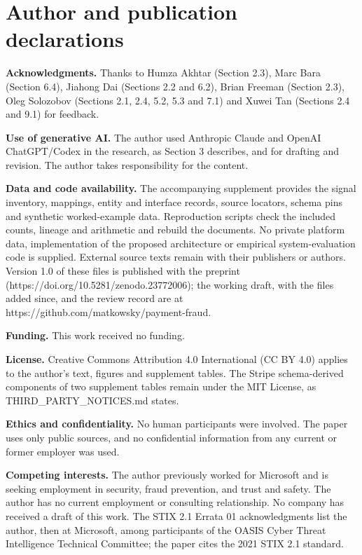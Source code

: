 \documentclass[acmlarge,nonacm]{acmart}
\begin{document}
\hypertarget{author-and-publication-declarations}{%
\section*{Author and publication
declarations}\label{author-and-publication-declarations}}

\textbf{Acknowledgments.} Thanks to Humza Akhtar (Section 2.3), Marc
Bara (Section 6.4), Jiahong Dai (Sections 2.2 and 6.2), Brian Freeman
(Section 2.3), Oleg Solozobov (Sections 2.1, 2.4, 5.2, 5.3 and 7.1) and
Xuwei Tan (Sections 2.4 and 9.1) for feedback.

\textbf{Use of generative AI.} The author used Anthropic Claude and
OpenAI ChatGPT/Codex in the research, as Section 3 describes, and for
drafting and revision. The author takes responsibility for the content.

\textbf{Data and code availability.} The accompanying supplement
provides the signal inventory, mappings, entity and interface records,
source locators, schema pins and synthetic worked-example data.
Reproduction scripts check the included counts, lineage and arithmetic
and rebuild the documents. No private platform data, implementation of
the proposed architecture or empirical system-evaluation code is
supplied. External source texts remain with their publishers or authors.
Version 1.0 of these files is published with the preprint
(https://doi.org/10.5281/zenodo.23772006); the working draft, with the
files added since, and the review record are at
https://github.com/matkowsky/payment-fraud.

\textbf{Funding.} This work received no funding.

\textbf{License.} Creative Commons Attribution 4.0 International (CC BY
4.0) applies to the author's text, figures and supplement tables. The
Stripe schema-derived components of two supplement tables remain under
the MIT License, as THIRD\_PARTY\_NOTICES.md states.

\textbf{Ethics and confidentiality.} No human participants were
involved. The paper uses only public sources, and no confidential
information from any current or former employer was used.

\textbf{Competing interests.} The author previously worked for Microsoft
and is seeking employment in security, fraud prevention, and trust and
safety. The author has no current employment or consulting relationship.
No company has received a draft of this work. The STIX 2.1 Errata 01
acknowledgments list the author, then at Microsoft, among participants
of the OASIS Cyber Threat Intelligence Technical Committee; the paper
cites the 2021 STIX 2.1 standard.
\end{document}
